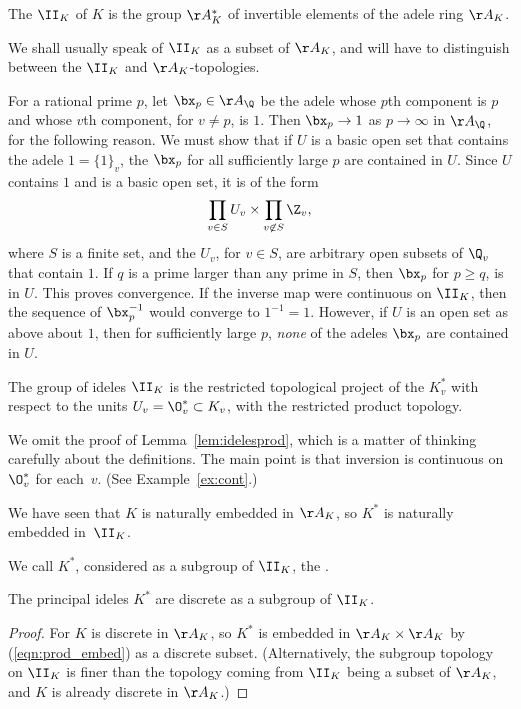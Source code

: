 \documentclass[11pt]{book}
\begin{document}
\begin{ch}
\begin{definition}
  The  $\II_K$ of $K$ is the group $\AA_K^*$ of invertible
  elements of the adele ring $\AA_K$.
\end{definition}
We shall usually speak of $\II_K$ as a subset of $\AA_K$, and will
have to distinguish between the $\II_K$ and $\AA_K$-topologies.
\begin{example}
For a rational prime $p$, let $\bx_p\in \AA_\Q$ be the adele whose $p$th
component is $p$ and whose $v$th component, for $v\neq p$, is $1$.
Then $\bx_p \to 1$ as $p\to\infty$ in $\AA_\Q$, for the following reason.
We must show that if $U$ is a basic open set that contains the
adele $1=\{1\}_v$, the $\bx_p$ for all sufficiently large $p$
are contained in $U$.  Since $U$ contains $1$ and is a basic
open set, it is of the form
$$\prod_{v\in S} U_v \times \prod_{v\not\in S} \Z_v,$$
where $S$ is a finite set, and the $U_v$, for $v\in S$, are
arbitrary open subsets of $\Q_v$ that contain $1$.
If $q$ is a prime larger than any prime in $S$, then
$\bx_p$ for $p\geq q$, is in $U$.   This proves
convergence.
If the inverse map were continuous on $\II_K$, then
the sequence of $\bx_p^{-1}$ would converge to $1^{-1}=1$.
However, if $U$ is an open set as above about $1$, then
for sufficiently large $p$, {\em none} of the adeles $\bx_p$ are
contained in $U$.
\end{example}


\begin{lemma}\label{lem:idelesprod}
The group of ideles $\II_K$ is the restricted topological project
of the $K_v^*$ with respect to the units $U_v=\O_v^*\subset K_v$,
with the restricted product topology.
\end{lemma}
We omit the proof of Lemma~\ref{lem:idelesprod}, which is a
matter of thinking carefully about the definitions.  The main
point is that inversion is continuous on $\O_v^*$ for each~$v$.
(See Example~\ref{ex:cont}.)


We have seen that $K$ is naturally embedded in $\AA_K$, so
$K^*$ is naturally embedded in~$\II_K$.
\begin{definition}
  We call $K^*$, considered as a subgroup of $\II_K$, the
.
\end{definition}

\begin{lemma}
The principal ideles $K^*$ are discrete as a subgroup of $\II_K$.
\end{lemma}
\begin{proof}
  For $K$ is discrete in $\AA_K$, so $K^*$ is embedded in $\AA_K\times
  \AA_K$ by (\ref{eqn:prod_embed}) as a discrete subset.
  (Alternatively, the subgroup topology on $\II_K$ is finer than the
  topology coming from $\II_K$ being a subset of $\AA_K$, and $K$ is
  already discrete in $\AA_K$.)
\end{proof}


\end{ch}
\end{document}
